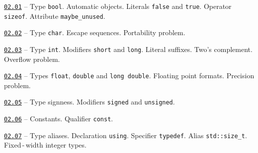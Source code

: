 \documentclass[a4paper,12pt]{article}
\renewenvironment{itemize}
{
    \begin{list}{\labelitemi}
    {
      \setlength{\topsep}{0pt}
      \setlength{\partopsep}{0pt}
      \setlength{\parskip}{0pt}
      \setlength{\itemsep}{0pt}
      \setlength{\parsep}{0pt}
      \setlength{\leftmargin}{14.5pt}
    }
}{\end{list}}
\begin{document}
\begin{itemize}
    
    \item \href{https://github.com/i-s-m-mipt/Education/blob/master/projects/examples/source/02.01.cpp}{\texttt{02.01}} -- Type \lstinline{bool}. Automatic objects. Literals \lstinline{false} and \lstinline{true}. Operator \lstinline{sizeof}. Attribute \lstinline{maybe_unused}.

    \smallskip

    \item \href{https://github.com/i-s-m-mipt/Education/blob/master/projects/examples/source/02.02.cpp}{\texttt{02.02}} -- Type \lstinline{char}. Escape sequences. Portability problem.

    \smallskip

    \item \href{https://github.com/i-s-m-mipt/Education/blob/master/projects/examples/source/02.03.cpp}{\texttt{02.03}} -- Type \lstinline{int}. Modifiers \lstinline{short} and \lstinline{long}. Literal suffixes. Two's complement. Overflow problem.

    \smallskip
    
    \item \href{https://github.com/i-s-m-mipt/Education/blob/master/projects/examples/source/02.04.cpp}{\texttt{02.04}} -- Types \lstinline{float}, \lstinline{double} and \lstinline{long double}. Floating point formats. Precision problem.

    \smallskip

    \item \href{https://github.com/i-s-m-mipt/Education/blob/master/projects/examples/source/02.05.cpp}{\texttt{02.05}} -- Type signness. Modifiers \lstinline{signed} and \lstinline{unsigned}.

    \smallskip

    \item \href{https://github.com/i-s-m-mipt/Education/blob/master/projects/examples/source/02.06.cpp}{\texttt{02.06}} -- Constants. Qualifier \lstinline{const}.

    \smallskip

    \item \href{https://github.com/i-s-m-mipt/Education/blob/master/projects/examples/source/02.07.cpp}{\texttt{02.07}} -- Type aliases. Declaration \lstinline{using}. Specifier \lstinline{typedef}. Alias \lstinline{std::size_t}. Fixed\,-\,width integer types.
    
\end{itemize}
\end{document}

